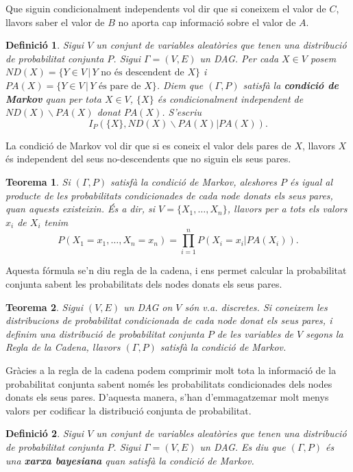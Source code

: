 \documentclass{article}
\newtheorem{teorema}{Teorema}
\newtheorem{definicio}{Definici\'{o}}
\theoremstyle{definition}
\begin{document}
Que siguin condicionalment independents vol dir que si coneixem el valor de $C$, llavors saber el valor de $B$ no aporta cap informaci\'{o} sobre el valor de $A$.

\begin{definicio}
Sigui $V$ un conjunt de variables aleat\`{o}ries que tenen una distribuci\'{o} de probabilitat conjunta $P$. Sigui $\Gamma=(V,E)$ un DAG. Per cada $X\in V$ posem $ND(X)=\{Y\in V\,|\,Y\text{ no \'{e}s descendent de }X\}$ i $PA(X)=\{Y\in V\,|\,Y\text{ \'{e}s pare de }X\}$. Diem que $(\Gamma,P)$ satisf\`{a} la \textbf{condici\'{o} de Markov} quan per tota $X\in V$, $\{X\}$ \'{e}s condicionalment independent de $ND(X)\backslash PA(X)$ donat $PA(X)$. S'escriu
\[I_P(\{X\},ND(X)\backslash PA(X)|PA(X)).\]
\end{definicio}

La condici\'{o} de Markov vol dir que si es coneix el valor dels pares de $X$, llavors $X$ \'{e}s independent del seus no-descendents que no siguin els seus pares.

\begin{teorema}
Si $(\Gamma,P)$ satisf\`{a} la condici\'{o} de Markov, aleshores $P$ \'{e}s igual al producte de les probabilitats condicionades de cada node donats els seus pares, quan aquests existeixin. \'{E}s a dir, si $V=\{X_1,\ldots,X_n\}$, llavors per a tots els valors $x_i$ de $X_i$ tenim
\[P(X_1=x_1,\ldots,X_n=x_n)=\prod_{i=1}^nP(X_i=x_i|PA(X_i)).\]
\end{teorema}

Aquesta f\'{o}rmula se'n diu regla de la cadena, i ens permet calcular la probabilitat conjunta sabent les probabilitats dels nodes donats els seus pares.

\begin{teorema}
Sigui $(V,E)$ un DAG on $V$ s\'{o}n v.a. discretes. Si coneixem les distribucions de probabilitat condicionada de cada node donat els seus pares, i definim una distribuci\'{o} de probabilitat conjunta $P$ de les variables de $V$ segons la Regla de la Cadena, llavors $(\Gamma,P)$ satisf\`{a} la condici\'{o} de Markov.
\end{teorema}

Gr\`{a}cies a la regla de la cadena podem comprimir molt tota la informaci\'{o} de la probabilitat conjunta sabent nom\'{e}s les probabilitats condicionades dels nodes donats els seus pares. D'aquesta manera, s'han d'emmagatzemar molt menys valors per codificar la distribuci\'{o} conjunta de probabilitat.

\begin{definicio}
Sigui $V$ un conjunt de variables aleat\`{o}ries que tenen una distribuci\'{o} de probabilitat conjunta $P$. Sigui $\Gamma=(V,E)$ un DAG. Es diu que $(\Gamma,P)$ \'{e}s una \textbf{xarxa bayesiana} quan satisf\`{a} la condici\'{o} de Markov.
\end{definicio}
\end{document}
